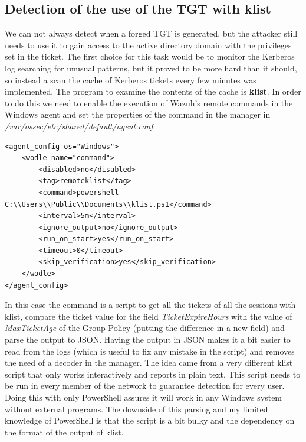 \subsection{Detection of the use of the TGT with klist} \label{klist_detection}
We can not always detect when a forged TGT is generated, but the attacker still needs to use it to gain access to the active directory domain with the privileges set in the ticket. The first choice for this task would be to monitor the Kerberos log searching for unusual patterns, but it proved to be more hard than it should, so instead a scan the cache of Kerberos tickets every few minutes was implemented.
\linej
The program to examine the contents of the cache is \textbf{klist}.
\linej
\linej
In order to do this we need to enable the execution of Wazuh's remote commands in the Windows agent and set the properties of the command in the manager in \textit{/var/ossec/etc/shared/default/agent.conf}\cite{wazuh_remote_command}:
\linej
\label{klist_script_wodle}
\begin{lstlisting}[style=xml]
<agent_config os="Windows">
	<wodle name="command">
		<disabled>no</disabled>
		<tag>remoteklist</tag>
		<command>powershell C:\\Users\\Public\\Documents\\klist.ps1</command>
		<interval>5m</interval>
		<ignore_output>no</ignore_output>
		<run_on_start>yes</run_on_start>
		<timeout>0</timeout>
		<skip_verification>yes</skip_verification>
	</wodle>
</agent_config>
\end{lstlisting}
\linej
In this case the command is a script to get all the tickets of all the sessions with klist, compare the ticket value for the field \textit{TicketExpireHours} with the value of \textit{MaxTicketAge} of the Group Policy (putting the difference in a new field) and parse the output to JSON. Having the output in JSON makes it a bit easier to read from the logs (which is useful to fix any mistake in the script) and removes the need of a decoder in the manager.
The idea came from a very different klist script that only works interactively and reports in plain text\cite{klist_script_idea}.
\linej
This script needs to be run in every member of the network to guarantee detection for every user.
\linej
Doing this with only PowerShell assures it will work in any Windows system without external programs. The downside of this parsing and my limited knowledge of PowerShell is that the script is a bit bulky and the dependency on the format of the output of klist.
